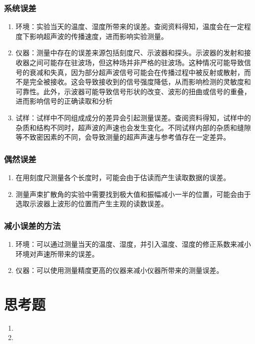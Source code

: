 \documentclass[a4paper,utf8]{article}
\begin{document}
\subsubsection{系统误差}
\begin{enumerate}
    \item 环境：实验当天的温度、湿度所带来的误差。查阅资料得知，温度会在一定程度下影响超声波的传播速度，进而影响实验测量。
    \item 仪器：测量中存在的误差来源包括刻度尺、示波器和探头。示波器的发射和接收器之间可能存在驻波场，但这种场并非严格的驻波场。这种情况可能导致信号的衰减和失真，因为部分超声波信号可能会在传播过程中被反射或散射，而不是完全被接收。这会导致接收到的信号强度降低，从而影响检测的灵敏度和可靠性。此外，示波器可能导致信号形状的改变、波形的扭曲或信号的重叠，进而影响信号的正确读取和分析
    \item 试样：试样中不同组成成分的差异会引起测量误差。查阅资料得知，试样中的杂质和结构不同时，超声波的声速也会发生变化。不同试样内部的杂质和缝隙等不致密因素的不同，会导致测量的超声声速与参考值存在一定差异。
\end{enumerate}
\subsubsection{偶然误差}
\begin{enumerate}
    \item 在用刻度尺测量各个长度时，可能会由于估读而产生读取数据的误差。
    \item 测量声束扩散角的实验中需要找到极大值和振幅减小一半的位置，可能会由于选取示波器上波形的位置而产生主观的读数误差。
\end{enumerate}
\subsubsection{减小误差的方法}
\begin{enumerate}
    \item 环境：可以通过测量当天的温度、湿度，并引入温度、湿度的修正系数来减小环境对声速所带来的误差。
    \item 仪器：可以使用测量精度更高的仪器来减小仪器所带来的测量误差。
\end{enumerate}
\section{思考题}
\begin{enumerate}
    \item {}
    \item {}
\end{enumerate}
\end{document}
